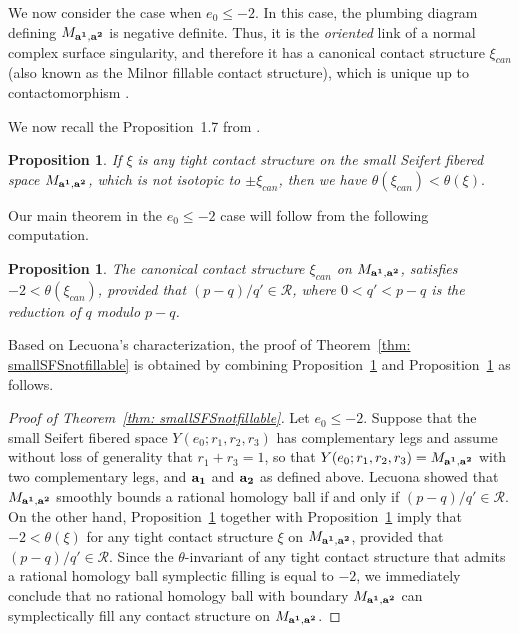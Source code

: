 \documentclass[11pt]{amsart}
\theoremstyle{plain}
\newtheorem{proposition}[theorem]{Proposition}
\theoremstyle{definition}
\theoremstyle{remark}
\numberwithin{theorem}{section}
\begin{document}
We now consider the case when $e_0\leq -2$. In this case, the plumbing diagram defining $M_{{\bf a^1}, {\bf a^2}}$ is negative definite. Thus, it is the {\em oriented} link of a normal complex surface singularity, and therefore it has a canonical contact structure $\xi_{can}$ (also known as the Milnor fillable contact structure), which is unique up to contactomorphism \cite{CaubelNemethiPopescu-Pampu2006}.   

We now recall the Proposition~1.7 from \cite{EtnyreOzbagciTosun2025}.
\begin{proposition}\label{prop: rational}  If $\xi$ is any tight contact structure on the small Seifert fibered space $M_{{\bf a^1}, {\bf a^2}}$, which is not isotopic to $\pm \xi_{can}$,   then we have $ \theta(\xi_{can}) < \theta(\xi).$
\end{proposition}

Our main theorem in the $e_0\leq -2$ case will follow from the following computation. 
\begin{proposition} \label{prop: minSFS} The canonical contact structure $\xi_{can}$ on $M_{{\bf a^1}, {\bf a^2}}$,  satisfies
$-2 < \theta (\xi_{can})$, provided that  $(p-q)/q' \in\mathcal{R}$, where $0 < q' < p - q$ is
the reduction of $q$ modulo $p - q$.
 \end{proposition}
 
Based on Lecuona's characterization, the proof of Theorem~\ref{thm: smallSFSnotfillable} is obtained by combining Proposition~\ref{prop: rational}  and Proposition~\ref{prop: minSFS} as follows.

\begin{proof} [Proof of Theorem~\ref{thm: smallSFSnotfillable}] Let $e_0 \leq -2$. Suppose that the small Seifert fibered space $Y(e_0; r_1, r_2, r_3)$ has complementary legs and assume without loss of generality that $r_1+r_3=1$, so that $Y(e_0; r_1, r_2, r_3)= M_{{\bf a^1}, {\bf a^2}}$ with two complementary legs, and ${\bf a_1}$ and ${\bf a_2}$ as defined above. Lecuona \cite{Lecuona2019} showed that $M_{{\bf a^1}, {\bf a^2}}$ smoothly bounds a rational homology ball if and only if $(p-q)/q' \in\mathcal{R}$. On the other hand, Proposition~\ref{prop: minSFS} together with Proposition~\ref{prop: rational} imply that $-2 < \theta (\xi)$ for any tight contact structure $\xi$ on  $M_{{\bf a^1}, {\bf a^2}}$, provided that  $(p-q)/q' \in\mathcal{R}$.  Since the $\theta$-invariant of any tight contact structure that admits a rational homology ball symplectic filling is equal to $-2$, we immediately conclude that no rational homology ball with boundary $M_{{\bf a^1}, {\bf a^2}}$ can symplectically fill any contact structure on $M_{{\bf a^1}, {\bf a^2}}$.\end{proof}
\end{document}
